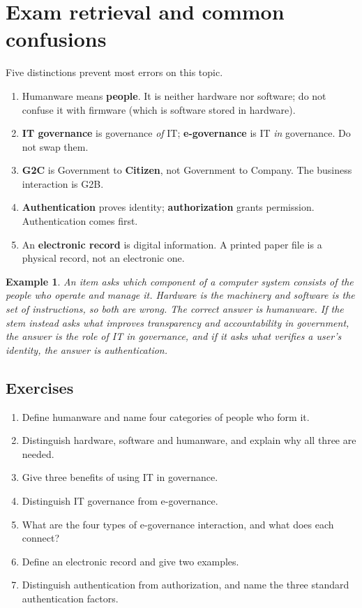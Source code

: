 \documentclass[11pt]{article}
\newtheorem{example}{Example}[section]
\begin{document}
\section{Exam retrieval and common confusions}
Five distinctions prevent most errors on this topic.
\begin{enumerate}
  \item Humanware means \textbf{people}. It is neither hardware nor software;
    do not confuse it with firmware (which is software stored in hardware).
  \item \textbf{IT governance} is governance \emph{of} IT;
    \textbf{e-governance} is IT \emph{in} governance. Do not swap them.
  \item \textbf{G2C} is Government to \textbf{Citizen}, not Government to
    Company. The business interaction is G2B.
  \item \textbf{Authentication} proves identity; \textbf{authorization}
    grants permission. Authentication comes first.
  \item An \textbf{electronic record} is digital information. A printed paper
    file is a physical record, not an electronic one.
\end{enumerate}

\begin{example}
An item asks which component of a computer system consists of the people who
operate and manage it. Hardware is the machinery and software is the set of
instructions, so both are wrong. The correct answer is humanware. If the stem
instead asks what improves transparency and accountability in government, the
answer is the role of IT in governance, and if it asks what verifies a user's
identity, the answer is authentication.
\end{example}

\subsection*{Exercises}
\begin{enumerate}[label=\arabic*.]
  \item Define humanware and name four categories of people who form it.
  \item Distinguish hardware, software and humanware, and explain why all
    three are needed.
  \item Give three benefits of using IT in governance.
  \item Distinguish IT governance from e-governance.
  \item What are the four types of e-governance interaction, and what does
    each connect?
  \item Define an electronic record and give two examples.
  \item Distinguish authentication from authorization, and name the three
    standard authentication factors.
\end{enumerate}
\end{document}
